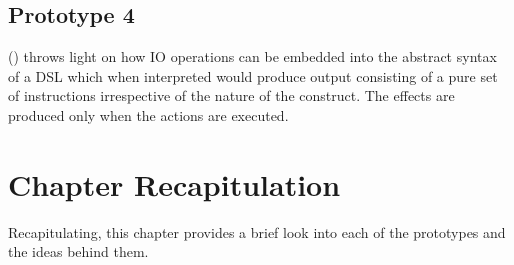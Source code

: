 \documentclass[thesis-solanki.tex]{subfiles}
\begin{document}
\subsection{Prototype 4}

  () throws light on how IO operations can be embedded into the abstract
  syntax of a DSL which when interpreted would produce output consisting of a pure set of instructions irrespective
  of the nature of the construct.
  The effects are produced only when the actions are executed.

\begin{comment}
\section{Thesis Improved Contributions}\label{sec:thes-impr-contr}

\begin{enumerate}
\item Prototype 1 does
flattening language
opening up the language (binding monad)
adding custom variables
monadic unification (stuff happens in a bubble)
rec type $\rightarrow$ non rec type $\rightarrow$ fix non rec type isomorphically == rec type

You can make an Flatterm int

but you cannot make term int

adding quantifiers


\item Prototype 2 does
extends current prolog-0.2.0.1
this is to show that we can plug out approach into existing implementation and things work

\item Prototype 3 does
variable search strategy
what ever method you do for searching at the point of unification you can do it with our approach

\item Prototype 4 does
how can io be squeezed into this model where whenever the resolver encounters an io operation it generates a thunk (sort of unsolved
statement) which when executed would result in a side effect but till that point every thing is pure

\end{enumerate}
\end{comment}


\section{Chapter Recapitulation}
Recapitulating, this chapter provides a brief look into each of the prototypes and the ideas behind them.

\ifMain
\begin{scope}
  \nolinenumbers
  \enotesize
  \par
  \begin{singlespace}
  \setlength{\parskip}{12pt plus 2pt minus 1pt}
  \theendnotes
  \par
  \end{singlespace}
\end{scope}
\fi
\end{document}
